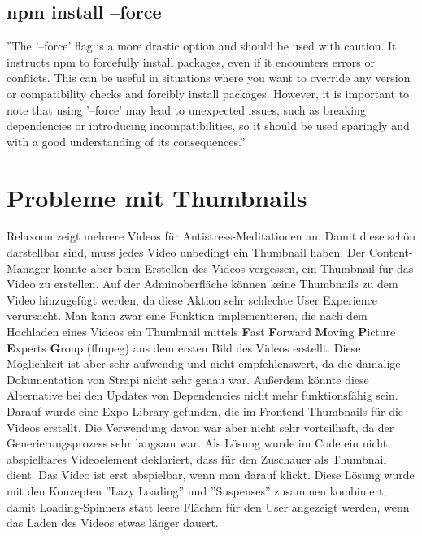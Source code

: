 \subsection{npm install --force}\label{subsec:npm-install---force}
''The '--force'  flag is a more drastic option and should be used with caution.
It instructs npm to forcefully install packages, even if it encounters errors or conflicts.
This can be useful in situations where you want to override any version or compatibility checks
and forcibly install packages.
However, it is important to note that using '--force'
may lead to unexpected issues, such as breaking dependencies or introducing incompatibilities,
so it should be used sparingly and with a good understanding of its consequences.''
\cite{installFlags}




\section{Probleme mit Thumbnails}\label{sec:probleme-mit-thumbnails}


Relaxoon zeigt mehrere Videos für Antistress-Meditationen an. Damit diese schön darstellbar sind,
muss jedes Video unbedingt ein Thumbnail haben.
Der Content-Manager könnte aber beim Erstellen des Videos vergessen,
ein Thumbnail für das Video zu erstellen.
Auf der Adminoberfläche können keine Thumbnails zu dem Video hinzugefügt werden,
da diese Aktion sehr schlechte User Experience verursacht.
Man kann zwar eine Funktion implementieren,
die nach dem Hochladen eines Videos ein Thumbnail mittels \textbf{F}ast \textbf{F}orward \textbf{M}oving
\textbf{P}icture \textbf{E}xperts \textbf{G}roup (ffmpeg) aus dem ersten Bild des Videos erstellt.
Diese Möglichkeit ist aber sehr aufwendig und nicht empfehlenswert, da die damalige Dokumentation von
Strapi nicht sehr genau war.
Außerdem könnte diese Alternative bei den Updates von Dependencies nicht mehr funktionsfähig sein.
Darauf wurde eine Expo-Library gefunden, die im Frontend Thumbnails für die Videos erstellt.
Die Verwendung davon war aber nicht sehr vorteilhaft, da der Generierungsprozess sehr langsam war.
Als Lösung wurde im Code ein nicht abspielbares Videoelement deklariert,
dass für den Zuschauer als Thumbnail dient.
Das Video ist erst abspielbar, wenn man darauf klickt.
Diese Lösung wurde mit den Konzepten ''Lazy Loading'' und ''Suspenses'' zusammen kombiniert,
damit Loading-Spinners statt leere Flächen für den User angezeigt werden,
wenn das Laden des Videos etwas länger dauert.



